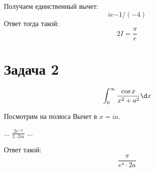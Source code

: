 	\TODO
	Получаем единственный вычет:
	\[ ie{-1}/(-4) \]
	Ответ тогда такой:
	\[ 2I = \frac{\pi}{e} \]

\section{Задача 2}
	\[ \int_0^{\infty} \frac{\cos x}{x^2+a^2} \d x \]

	Посмотрим на полюса 
	Вычет в $x=ia$.

	...
	$\frac{2e^{-a}}{2\cdot2ia}$
	...

	Ответ такой:
	\[ \frac{\pi}{e^a\cdot2a} \]
